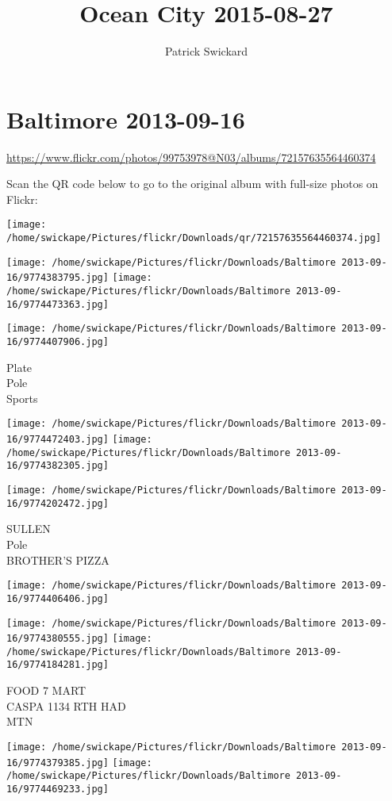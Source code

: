 \documentclass[10pt,letterpaper]{article}
\title{Ocean City 2015-08-27}
\author{Patrick Swickard}
\date{}
\begin{document}
\section*{Baltimore 2013-09-16}

\url{https://www.flickr.com/photos/99753978@N03/albums/72157635564460374}

Scan the QR code below to go to the original album with full-size photos on Flickr:

\texttt{[image: /home/swickape/Pictures/flickr/Downloads/qr/72157635564460374.jpg]}
\pagebreak

\texttt{[image: /home/swickape/Pictures/flickr/Downloads/Baltimore 2013-09-16/9774383795.jpg]}
\texttt{[image: /home/swickape/Pictures/flickr/Downloads/Baltimore 2013-09-16/9774473363.jpg]}

\vspace{0.25in}
\texttt{[image: /home/swickape/Pictures/flickr/Downloads/Baltimore 2013-09-16/9774407906.jpg]}

Plate\\
Pole\\
Sports
\pagebreak

\texttt{[image: /home/swickape/Pictures/flickr/Downloads/Baltimore 2013-09-16/9774472403.jpg]}
\texttt{[image: /home/swickape/Pictures/flickr/Downloads/Baltimore 2013-09-16/9774382305.jpg]}

\texttt{[image: /home/swickape/Pictures/flickr/Downloads/Baltimore 2013-09-16/9774202472.jpg]}

SULLEN\\
Pole\\
BROTHER'S PIZZA
\pagebreak

\texttt{[image: /home/swickape/Pictures/flickr/Downloads/Baltimore 2013-09-16/9774406406.jpg]}

\vspace{0.25in}
\texttt{[image: /home/swickape/Pictures/flickr/Downloads/Baltimore 2013-09-16/9774380555.jpg]}
\texttt{[image: /home/swickape/Pictures/flickr/Downloads/Baltimore 2013-09-16/9774184281.jpg]}

FOOD 7 MART\\
CASPA 1134 RTH HAD\\
MTN
\pagebreak

\texttt{[image: /home/swickape/Pictures/flickr/Downloads/Baltimore 2013-09-16/9774379385.jpg]}
\texttt{[image: /home/swickape/Pictures/flickr/Downloads/Baltimore 2013-09-16/9774469233.jpg]}
\end{document}
